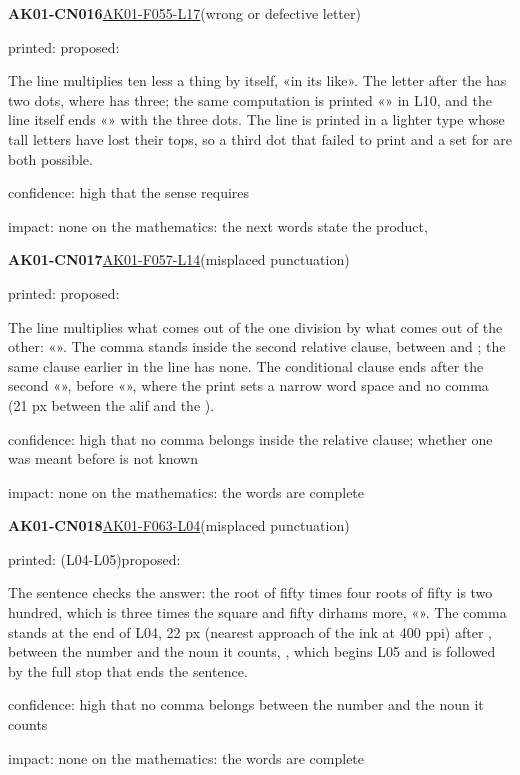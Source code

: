 \documentclass[11pt]{article}
\begin{document}
\noindent\textbf{AK01-CN016}\enspace\hyperlink{AK01-F055-L17}{AK01-F055-L17}\enspace(wrong or defective letter)\par\noindent printed: \enspace proposed: \par\noindent The line multiplies ten less a thing by itself, «in its like». The letter after the  has two dots, where  has three; the same computation is printed «» in L10, and the line itself ends «» with the three dots. The line is printed in a lighter type whose tall letters have lost their tops, so a third dot that failed to print and a  set for  are both possible.\par\noindent confidence: high that the sense requires \par\noindent impact: none on the mathematics: the next words state the product, \par\medskip
\noindent\textbf{AK01-CN017}\enspace\hyperlink{AK01-F057-L14}{AK01-F057-L14}\enspace(misplaced punctuation)\par\noindent printed: \enspace proposed: \par\noindent The line multiplies what comes out of the one division by what comes out of the other: «». The comma stands inside the second relative clause, between  and ; the same clause earlier in the line has none. The conditional clause ends after the second «», before «», where the print sets a narrow word space and no comma (21 px between the alif and the ).\par\noindent confidence: high that no comma belongs inside the relative clause; whether one was meant before  is not known\par\noindent impact: none on the mathematics: the words are complete\par\medskip
\noindent\textbf{AK01-CN018}\enspace\hyperlink{AK01-F063-L04}{AK01-F063-L04}\enspace(misplaced punctuation)\par\noindent printed:  (L04-L05)\enspace proposed: \par\noindent The sentence checks the answer: the root of fifty times four roots of fifty is two hundred, which is three times the square and fifty dirhams more, «». The comma stands at the end of L04, 22 px (nearest approach of the ink at 400 ppi) after , between the number and the noun it counts, , which begins L05 and is followed by the full stop that ends the sentence.\par\noindent confidence: high that no comma belongs between the number and the noun it counts\par\noindent impact: none on the mathematics: the words are complete\par\medskip
\end{document}
